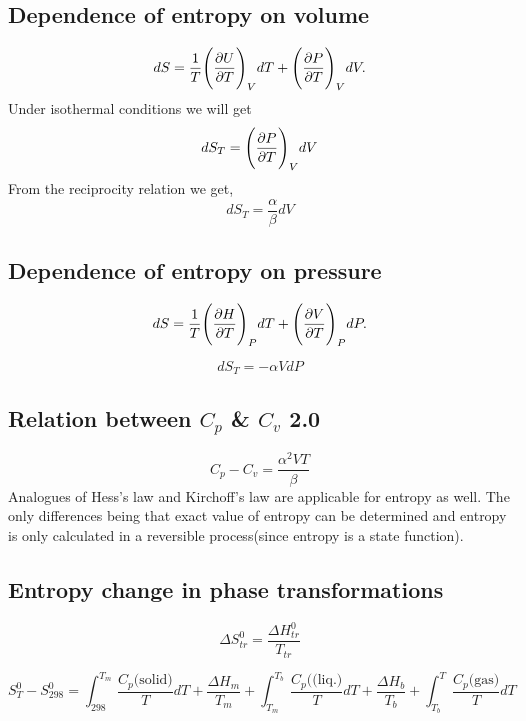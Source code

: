 \documentclass[12pt]{article}
\begin{document}
\subsection{Dependence of entropy on volume}
\begin{equation}
	dS=\frac{1}{T}\Bigg(\pdv{U}{T}\Bigg)_VdT+\Bigg(\pdv{P}{T}\Bigg)_V dV.
\end{equation}
Under isothermal conditions we will get
\begin{equation}
	dS_T=\Bigg(\pdv{P}{T}\Bigg)_VdV
\end{equation}
From the reciprocity relation we get,
\begin{equation}
	\boxed{dS_T=\frac{\alpha}{\beta}dV}
\end{equation}

\subsection{Dependence of entropy on pressure}
\begin{equation}
		dS=\frac{1}{T}\Bigg(\pdv{H}{T}\Bigg)_PdT+\Bigg(\pdv{V}{T}\Bigg)_P dP.
\end{equation}

\begin{equation}
	\boxed{dS_T=-\alpha VdP}
\end{equation}

\subsection{Relation between $C_p$ \& $C_v$ 2.0}
\begin{equation}
	\boxed{C_p-C_v=\dfrac{\alpha^2 VT}{\beta}}
\end{equation}
Analogues of Hess's law and Kirchoff's law are applicable for entropy as well. The only differences being that exact value of entropy can be determined and entropy is only calculated in a reversible process(since entropy is a state function).

\subsection{Entropy change in phase transformations}
\begin{equation}
	\Delta S_{tr}^{0}=\dfrac{\Delta H_{tr}^{0}}{T_{tr}}
\end{equation}

\begin{tcolorbox}[title=Example]
	\tcblower
	\begin{equation*}
		S_{T}^{0}-S_{298}^{0}=\int_{298}^{T_m}\frac{C_p\text{(solid)}}{T}dT + \frac{\Delta H_m}{T_m} + \int_{T_m}^{T_b}\frac{C_p(\text{(liq.)}}{T}dT + \frac{\Delta H_b}{T_b} + \int_{T_b}^{T}\frac{C_p\text{(gas)}}{T}dT
	\end{equation*}
\end{tcolorbox}
\end{document}
